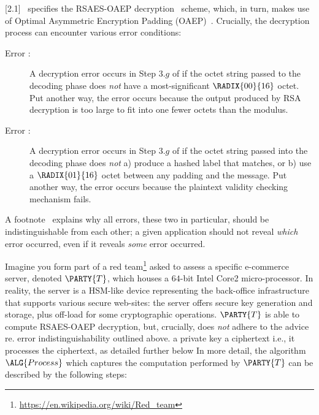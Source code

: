 %



[2.1]~\cite{SCALE:RFC:3447}
specifies the
RSAES-OAEP decryption~\cite[Section 7.1]{SCALE:RFC:3447}
scheme, which, in turn, makes use of 
Optimal Asymmetric Encryption Padding (OAEP)~\cite{SCALE:BelRog:94}.  
Crucially, the decryption process can encounter various error conditions:

\begin{description}
\item[Error :]
     A decryption error occurs in Step $3.g$ of  
     if the octet string passed to the decoding phase
     does {\em not} have a most-significant $\RADIX{00}{16}$ octet.
     Put another way, the error occurs because 
     the output produced by RSA decryption is too large to fit into one 
     fewer octets than the modulus.
\item[Error :]
     A decryption error occurs in Step $3.g$ of  
     if the octet string passed into the decoding phase 
     does {\em not} a) produce a hashed label that matches, or b) use a
     $\RADIX{01}{16}$ octet between any padding and the message.
     Put another way, the error occurs because 
     the plaintext validity checking mechanism fails.
\end{description}

\noindent
A footnote~\cite[Section 7.1.2]{SCALE:RFC:3447} explains why all errors, 
these two in particular, should be indistinguishable from each other; a
given application should not reveal {\em which} error occurred, even if
it reveals {\em some} error occurred.  

Imagine you form part of a red team\footnote{
\url{https://en.wikipedia.org/wiki/Red_team}
} asked to assess a specific e-commerce server, denoted 
$\PARTY{T}$, 
which houses a $64$-bit Intel Core2 micro-processor.  
In reality, the server is a HSM-like device representing the back-office 
infrastructure that supports various secure web-sites: the server offers
secure key generation and storage, plus off-load for some cryptographic 
operations.  
$\PARTY{T}$ 
is able to compute RSAES-OAEP decryption, but, crucially, does {\em not} 
adhere to the advice re. error indistinguishability outlined above.
\DESCINTRO[leak]
{}
{a private key}
{a ciphertext}
{i.e., it processes the ciphertext, as detailed further below}
{}
In more detail, the algorithm
$\ALG{Process}$
which captures the computation performed by
$\PARTY{T}$
can be described by the following steps:


